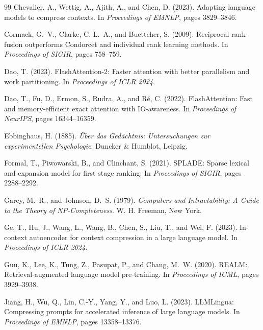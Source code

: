 \documentclass[review,12pt]{elsarticle}
\begin{document}
\begin{thebibliography}{99}
Chevalier, A., Wettig, A., Ajith, A., and Chen, D. (2023).
\newblock Adapting language models to compress contexts.
\newblock In \textit{Proceedings of EMNLP}, pages 3829--3846.

Cormack, G.~V., Clarke, C. L.~A., and Buettcher, S. (2009).
\newblock Reciprocal rank fusion outperforms Condorcet and individual rank
  learning methods.
\newblock In \textit{Proceedings of SIGIR}, pages 758--759.

Dao, T. (2023).
\newblock FlashAttention-2: Faster attention with better parallelism and work
  partitioning.
\newblock In \textit{Proceedings of ICLR 2024}.

Dao, T., Fu, D., Ermon, S., Rudra, A., and Ré, C. (2022).
\newblock FlashAttention: Fast and memory-efficient exact attention with
  IO-awareness.
\newblock In \textit{Proceedings of NeurIPS}, pages 16344--16359.

Ebbinghaus, H. (1885).
\newblock \textit{{\"U}ber das Ged{\"a}chtnis: Untersuchungen zur
  experimentellen Psychologie}.
\newblock Duncker \& Humblot, Leipzig.

Formal, T., Piwowarski, B., and Clinchant, S. (2021).
\newblock SPLADE: Sparse lexical and expansion model for first stage ranking.
\newblock In \textit{Proceedings of SIGIR}, pages 2288--2292.

Garey, M.~R., and Johnson, D.~S. (1979).
\newblock \textit{Computers and Intractability: A Guide to the Theory of
  NP-Completeness}.
\newblock W. H. Freeman, New York.

Ge, T., Hu, J., Wang, L., Wang, B., Chen, S., Liu, T., and Wei, F. (2023).
\newblock In-context autoencoder for context compression in a large language
  model.
\newblock In \textit{Proceedings of ICLR 2024}.

Guu, K., Lee, K., Tung, Z., Pasupat, P., and Chang, M.~W. (2020).
\newblock REALM: Retrieval-augmented language model pre-training.
\newblock In \textit{Proceedings of ICML}, pages 3929--3938.

Jiang, H., Wu, Q., Lin, C.-Y., Yang, Y., and Luo, L. (2023).
\newblock LLMLingua: Compressing prompts for accelerated inference of large
  language models.
\newblock In \textit{Proceedings of EMNLP}, pages 13358--13376.


\end{thebibliography}
\end{document}
